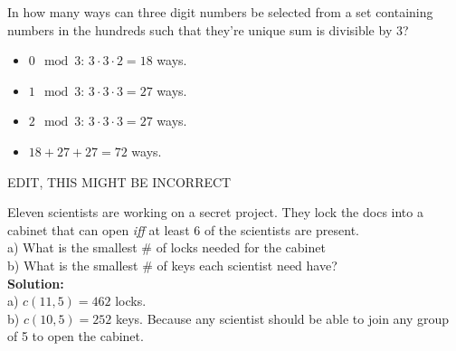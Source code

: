 \begin{example}
    In how many ways can three digit numbers be selected from a set containing numbers in the hundreds such that they're unique sum is divisible by $3$?
    \begin{itemize}
        \item $0 \mod 3$: $3 \cdot 3 \cdot 2 = 18$ ways.
        \item $1 \mod 3$: $3 \cdot 3 \cdot 3 = 27$ ways.
        \item $2 \mod 3$: $3 \cdot 3 \cdot 3 = 27$ ways.
        \item $18 + 27 + 27 = 72$ ways.
    \end{itemize}
    EDIT, THIS MIGHT BE INCORRECT
\end{example}

\begin{example}
    Eleven scientists are working on a secret project. They lock the docs into a cabinet that can open \textit{iff} at least $6$ of the scientists are present. \\
    a) What is the smallest # of locks needed for the cabinet \\
    b) What is the smallest # of keys each scientist need have? \\

    \textbf{Solution:} \\
    a) $c(11,5) = 462$ locks. \\
    b) $c(10,5) = 252$ keys. Because any scientist should be able to join any group of 5 to open the cabinet.
\end{example}